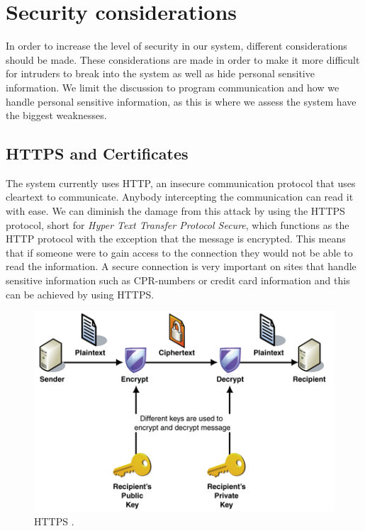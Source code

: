 \section{Security considerations}\label{sec:secure}
In order to increase the level of security in our system, different considerations should be made. These considerations are made in order to make it more difficult for intruders to break into the system as well as hide personal sensitive information. We limit the discussion to program communication and how we handle personal sensitive information, as this is where we assess the system have the biggest weaknesses.
 

\subsection*{HTTPS and Certificates} 
The system currently uses HTTP, an insecure communication protocol that uses cleartext to communicate. Anybody intercepting the communication can read it with ease. We can diminish the damage from this attack by using the HTTPS protocol, short for \textit{Hyper Text Transfer Protocol Secure}, which functions as the HTTP protocol with the exception that the message is encrypted. This means that if someone were to gain access to the connection they would not be able to read the information. A secure connection is very important on sites that handle sensitive information such as CPR-numbers or credit card information and this can be achieved by using HTTPS\cite{HTTPS}.

\begin{figure}[ht]
	\begin{center}
		\includegraphics[scale=0.9]{graphics/HTTPS.png}
		\caption{HTTPS \cite{https_pic}.}
		\label{fig:HTTPS}
	\end{center} 
\end{figure}

